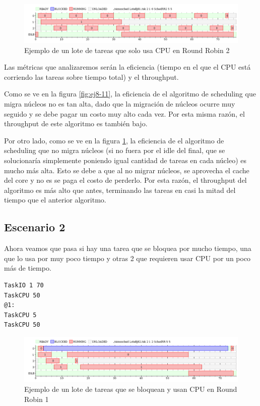 \begin{figure}[H]
\caption{Ejemplo de un lote de tareas que solo usa CPU en Round Robin 2}
\label{fig:ej8-12}
\includegraphics[width=1\textwidth]{imgs/ej8-1rr2.png}
\end{figure}

Las métricas que analizaremos serán la eficiencia (tiempo en el que el CPU está corriendo las tareas sobre tiempo total) y el throughput.

Como se ve en la figura \ref{fig:ej8-11}, la eficiencia de el algoritmo de scheduling que migra núcleos no es tan alta, dado que la migración de núcleos ocurre muy seguido y se debe pagar un costo muy alto cada vez. Por esta misma razón, el throughput de este algoritmo es también bajo.

Por otro lado, como se ve en la figura \ref{fig:ej8-12}, la eficiencia de el algoritmo de scheduling que no migra núcleos (si no fuera por el idle del final, que se solucionaría simplemente poniendo igual cantidad de tareas en cada núcleo) es mucho más alta. Esto se debe a que al no migrar núcleos, se aprovecha el cache del core y no es se paga el costo de perderlo. Por esta razón, el throughput del algoritmo es más alto que antes, terminando las tareas en casi la mitad del tiempo que el anterior algoritmo.

\subsection{Escenario 2}

Ahora veamos que pasa si hay una tarea que se bloquea por mucho tiempo, una que lo usa por muy poco tiempo y otras 2 que requieren usar CPU por un poco más de tiempo.

\begin{lstlisting}
TaskIO 1 70
TaskCPU 50
@1:
TaskCPU 5
TaskCPU 50
\end{lstlisting}

\begin{figure}[H]
\caption{Ejemplo de un lote de tareas que se bloquean y usan CPU en Round Robin 1}
\label{fig:ej8-21}
\includegraphics[width=1\textwidth]{imgs/ej8-2rr.png}
\end{figure}

